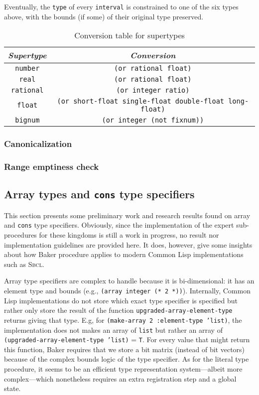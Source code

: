 \documentclass[format=sigconf]{acmart}
\newcommand\code[2][\small]{\sloppy\texttt{#1#2}}
\theoremstyle{definition}
\newcommand\sbcl{\textsc{Sbcl}}
\begin{document}
Eventually, the \code{type} of every \code{interval} is constrained to one of
the six types above, with the bounds (if some) of their original type preserved.

\begin{table}
  \centering
  \begin{tabular}{|c|c|}
    \hline
    \emph{Supertype} & \emph{Conversion} \\
    \hline
    \code{number} & \code{(or rational float)} \\
    \code{real} & \code{(or rational float)} \\
    \code{rational} & \code{(or integer ratio)} \\
    \code{float} & \code[\scriptsize]{(or short-float single-float double-float long-float)} \\
    \code{bignum} & \code{(or integer (not fixnum))} \\
    \hline
  \end{tabular}
  \caption{Conversion table for supertypes}
  \label{tab:numequiv}
\end{table}

\subsubsection{Canonicalization}
\subsubsection{Range emptiness check}


\subsection{Array types and \code[\large]{cons} type specifiers}
\label{sec:expoth}
This section presents some preliminary work and research results found on array
and \code{cons} type specifiers. Obviously, since the implementation of the
expert sub-procedures for these kingdoms is still a work in progress, no result
nor implementation guidelines are provided here. It does, however, give some
insights about how Baker procedure applies to modern Common Lisp implementations
such as \sbcl.

Array type specifiers are complex to handle because it is bi-dimensional: it
has an element type and bounds (e.g., \code{(array integer (* 2 *))}).
Internally, Common Lisp implementations do not store which exact type
specifier is specified but rather only store the result of the function
\code{upgraded-array-element-type} returns giving that type. E.g, for
\code{(make-array 2 :element-type 'list)}, the implementation does not makes an
array of \code{list} but rather an array of \code{(upgraded-array-element-type
  'list)} = \code{T}. For every value that might return this function, Baker
requires that we store a bit matrix (instead of bit vectors) because of the
complex bounds logic of the type specifier. As for the literal type procedure,
it seems to be an efficient type representation system---albeit more
complex---which nonetheless requires an extra registration step and a global
state.
\end{document}
